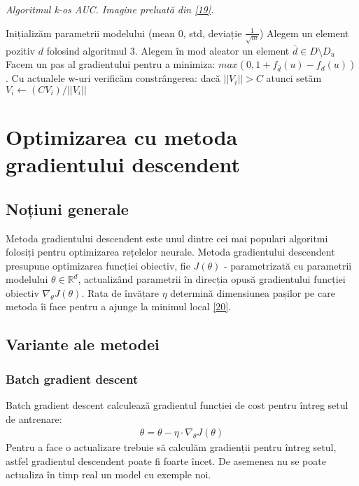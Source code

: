 \begin{algorithm}[!h]
\caption[Algoritmul k-os AUC]{\textit{Algoritmul k-os AUC. Imagine preluată din \hyperlink{jasonkos}{[19]}.}}
\begin{algorithmic}[!h]
    \State Inițializăm parametrii modelului (mean 0, std, deviație $\frac{1}{\sqrt{m}}$)
    \Repeat
    \State Alegem un element pozitiv $d$ folosind algoritmul 3.
    \State Alegem în mod aleator un element $\bar{d} \in D \setminus D_u$
        \State Facem un pas al gradientului pentru a minimiza:
        \State $max(0, 1 + f_{\bar{d}}(u) - f_d(u))$.
        \State Cu actualele w-uri verificăm constrângerea: dacă $|| V_i || > C$ atunci setăm $V_i \leftarrow (CV_i)/||V_i||$
    \EndIf
\EndProcedure
\end{algorithmic}
\end{algorithm}


\section{Optimizarea cu metoda gradientului descendent}
\subsection{Noțiuni generale}
Metoda gradientului descendent este unul dintre cei mai populari algoritmi folosiți pentru optimizarea rețelelor neurale. Metoda gradientului descendent presupune optimizarea funcției obiectiv, fie $J(\theta)$ - parametrizată cu parametrii modelului $\theta \in \mathbb{R}^d$, actualizând parametrii în direcția opusă gradientului funcției obiectiv $\nabla_{\theta}J(\theta)$. Rata de învățare $\eta$ determină dimensiunea pașilor pe care metoda îi face pentru a ajunge la minimul local \hyperlink{ruder2016}{[20]}.

\subsection{Variante ale metodei}
\subsubsection{Batch gradient descent}
Batch gradient descent calculează gradientul funcției de cost pentru întreg setul de antrenare:
\begin{align}
	\theta = \theta - \eta \cdot \nabla_{\theta}J(\theta)
\end{align}
Pentru a face o actualizare trebuie să calculăm gradienții pentru întreg setul, astfel gradientul descendent poate fi foarte încet. De asemenea nu se poate actualiza în timp real un model cu exemple noi.


